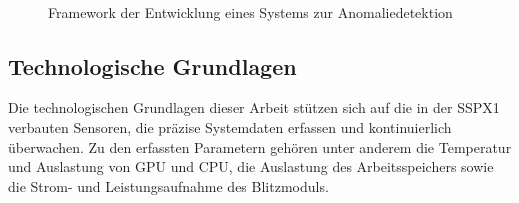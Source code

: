 \begin{figure}[H]
    \centering
    \caption{Framework der Entwicklung eines Systems zur Anomaliedetektion}
~\label{fig:pdm_framework}
\end{figure}

\subsection{Technologische Grundlagen}\label{sec:technologische_grundlagen}
Die technologischen Grundlagen dieser Arbeit stützen sich auf die in der SSPX1 verbauten Sensoren, die präzise Systemdaten erfassen
und kontinuierlich überwachen. Zu den erfassten Parametern gehören unter anderem die Temperatur und Auslastung von GPU und CPU,
die Auslastung des Arbeitsspeichers sowie die Strom- und Leistungsaufnahme des Blitzmoduls.


